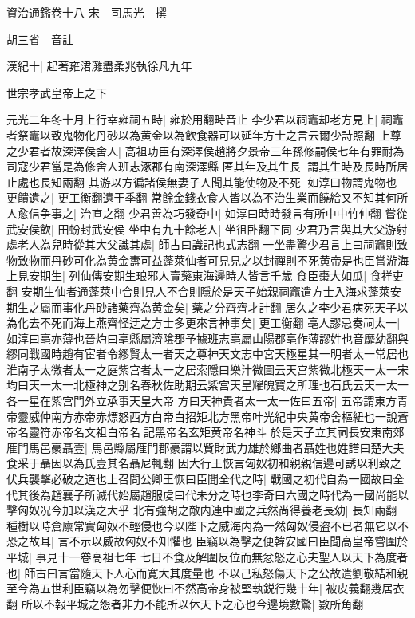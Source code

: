 資治通鑑卷十八
宋　司馬光　撰

胡三省　音註

漢紀十|{
	起著雍涒灘盡柔兆執徐凡九年}


世宗孝武皇帝上之下

元光二年冬十月上行幸雍祠五畤|{
	雍於用翻畤音止}
李少君以祠竈却老方見上|{
	祠竈者祭竈以致鬼物化丹砂以為黄金以為飲食器可以延年方士之言云爾少詩照翻}
上尊之少君者故深澤侯舍人|{
	高祖功臣有深澤侯趙將夕景帝三年孫修嗣侯七年有罪耐為司寇少君當是為修舍人班志涿郡有南深澤縣}
匿其年及其生長|{
	謂其生時及長時所居止處也長知兩翻}
其游以方徧諸侯無妻子人聞其能使物及不死|{
	如淳曰物謂鬼物也}
更饋遺之|{
	更工衡翻遺于季翻}
常餘金錢衣食人皆以為不治生業而饒給又不知其何所人愈信争事之|{
	治直之翻}
少君善為巧發奇中|{
	如淳曰時時發言有所中中竹仲翻}
嘗從武安侯飲|{
	田蚡封武安侯}
坐中有九十餘老人|{
	坐徂卧翻下同}
少君乃言與其大父游射處老人為兒時從其大父識其處|{
	師古曰識記也式志翻}
一坐盡驚少君言上曰祠竈則致物致物而丹砂可化為黄金夀可益蓬萊仙者可見見之以封禪則不死黄帝是也臣嘗游海上見安期生|{
	列仙傳安期生琅邪人賣藥東海邊時人皆言千歲}
食臣棗大如瓜|{
	食祥吏翻}
安期生仙者通蓬萊中合則見人不合則隱於是天子始親祠竈遣方士入海求蓬萊安期生之屬而事化丹砂諸藥齊為黄金矣|{
	藥之分齊齊才計翻}
居久之李少君病死天子以為化去不死而海上燕齊怪迂之方士多更來言神事矣|{
	更工衡翻}
亳人謬忌奏祠太一|{
	如淳曰亳亦薄也晉灼曰亳縣屬濟隂郡予據班志亳屬山陽郡亳作薄謬姓也音靡幼翻與繆同戰國時趙有宦者令繆賢太一者天之尊神天文志中宮天極星其一明者太一常居也淮南子太微者太一之庭紫宫者太一之居索隱曰樂汁微圖云天宫紫微北極天一太一宋均曰天一太一北極神之别名春秋佐助期云紫宫天皇耀魄寶之所理也石氏云天一太一各一星在紫宫門外立承事天皇大帝}
方曰天神貴者太一太一佐曰五帝|{
	五帝謂東方青帝靈威仲南方赤帝赤熛怒西方白帝白招矩北方黑帝叶光紀中央黄帝舍樞紐也一說蒼帝名靈符赤帝名文祖白帝名記黑帝名玄矩黄帝名神斗}
於是天子立其祠長安東南郊　㕍門馬邑豪聶壹|{
	馬邑縣屬㕍門郡豪謂以貲財武力雄於鄉曲者聶姓也姓譜曰楚大夫食采于聶因以為氏壹其名聶尼輒翻}
因大行王恢言匈奴初和親親信邊可誘以利致之伏兵襲擊必破之道也上召問公卿王恢曰臣聞全代之時|{
	戰國之初代自為一國故曰全代其後為趙襄子所滅代始屬趙服䖍曰代未分之時也李奇曰六國之時代為一國尚能以擊匈奴况今加以漢之大乎}
北有強胡之敵内連中國之兵然尚得養老長幼|{
	長知兩翻}
種樹以時倉廪常實匈奴不輕侵也今以陛下之威海内為一然匈奴侵盗不已者無它以不恐之故耳|{
	言不示以威故匈奴不知懼也}
臣竊以為擊之便韓安國曰臣聞高皇帝嘗圍於平城|{
	事見十一卷高祖七年}
七日不食及解圍反位而無忿怒之心夫聖人以天下為度者也|{
	師古曰言當隨天下人心而寛大其度量也}
不以己私怒傷天下之公故遣劉敬結和親至今為五世利臣竊以為勿擊便恢曰不然高帝身被堅執鋭行幾十年|{
	被皮義翻幾居衣翻}
所以不報平城之怨者非力不能所以休天下之心也今邊境數驚|{
	數所角翻}
